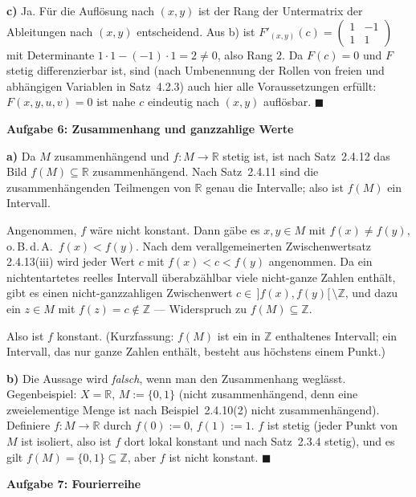 \documentclass[a4paper,12pt]{article}
\providecommand{\qed}{\hfill\ensuremath{\blacksquare}}
\newcommand{\aufgabe}[2]{%
  \bigskip\par\noindent\textbf{Aufgabe #1: #2}\par\nobreak\medskip}
\begin{document}
\textbf{c)} Ja. Für die Auflösung nach $(x,y)$ ist der Rang der Untermatrix der Ableitungen nach $(x,y)$ entscheidend. Aus b) ist $F'_{(x,y)}(c)=\begin{pmatrix}1&-1\\1&1\end{pmatrix}$ mit Determinante $1\cdot1-(-1)\cdot1=2\neq0$, also Rang $2$. Da $F(c)=0$ und $F$ stetig differenzierbar ist, sind (nach Umbenennung der Rollen von \glqq freien\grqq{} und \glqq abhängigen\grqq{} Variablen in Satz~4.2.3) auch hier alle Voraussetzungen erfüllt: $F(x,y,u,v)=0$ ist nahe $c$ eindeutig nach $(x,y)$ auflösbar. \qed

\aufgabe{6}{Zusammenhang und ganzzahlige Werte}

\textbf{a)} Da $M$ zusammenhängend und $f:M\to\mathbb{R}$ stetig ist, ist nach Satz~2.4.12 das Bild $f(M)\subseteq\mathbb{R}$ zusammenhängend. Nach Satz~2.4.11 sind die zusammenhängenden Teilmengen von $\mathbb{R}$ genau die Intervalle; also ist $f(M)$ ein Intervall.

Angenommen, $f$ wäre nicht konstant. Dann gäbe es $x,y\in M$ mit $f(x)\neq f(y)$, o.\,B.\,d.\,A.\ $f(x)<f(y)$. Nach dem verallgemeinerten Zwischenwertsatz 2.4.13(iii) wird jeder Wert $c$ mit $f(x)<c<f(y)$ angenommen. Da ein nichtentartetes reelles Intervall überabzählbar viele nicht-ganze Zahlen enthält, gibt es einen nicht-ganzzahligen Zwischenwert $c\in\,]f(x),f(y)[\,\setminus\mathbb{Z}$, und dazu ein $z\in M$ mit $f(z)=c\notin\mathbb{Z}$ --- Widerspruch zu $f(M)\subseteq\mathbb{Z}$.

Also ist $f$ konstant. (Kurzfassung: $f(M)$ ist ein in $\mathbb{Z}$ enthaltenes Intervall; ein Intervall, das nur ganze Zahlen enthält, besteht aus höchstens einem Punkt.)

\textbf{b)} Die Aussage wird \emph{falsch}, wenn man den Zusammenhang weglässt. Gegenbeispiel: $X=\mathbb{R}$, $M:=\{0,1\}$ (nicht zusammenhängend, denn eine zweielementige Menge ist nach Beispiel~2.4.10(2) nicht zusammenhängend). Definiere $f:M\to\mathbb{R}$ durch $f(0):=0$, $f(1):=1$. $f$ ist stetig (jeder Punkt von $M$ ist isoliert, also ist $f$ dort lokal konstant und nach Satz~2.3.4 stetig), und es gilt $f(M)=\{0,1\}\subseteq\mathbb{Z}$, aber $f$ ist nicht konstant. \qed

\aufgabe{7}{Fourierreihe}
\end{document}
